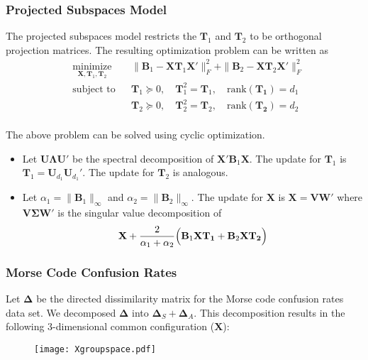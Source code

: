 \documentclass[professionalfonts,hyperref={pdfpagelabels=false,colorlinks=true,linkcolor=cyan}]{beamer}
\begin{document}
\begin{frame}
  \frametitle{Projected Subspaces Model}
  The projected subspaces model restricts the $\mathbf{T}_1$ and
  $\mathbf{T}_2$ to
  be orthogonal projection matrices. The resulting optimization
  problem can be written as
  \begin{equation}
  \label{eq:5}
	\begin{aligned}
	& \underset{\mathbf{X}, \mathbf{T}_1, \mathbf{T}_2}{\text{minimize}}
	& & \| \mathbf{B}_1 - \mathbf{X}
\mathbf{T}_1 \mathbf{X}' \|_F^2 +  \| \mathbf{B}_2 - \mathbf{X}
\mathbf{T}_2 \mathbf{X}' \|_F^2 \\
	& \text{subject to}
	& & \mathbf{T}_1 \succeq 0, \quad \mathbf{T}_1^2 = \mathbf{T}_1,
    \quad \mathrm{rank}(\mathbf{T_1}) = d_1 \\
	& & & \mathbf{T}_2 \succeq 0, \quad \mathbf{T}_2^2 = \mathbf{T}_2,
    \quad \mathrm{rank}(\mathbf{T_2}) = d_2 \\
	\end{aligned}
\end{equation}

The above problem can be solved using cyclic optimization. 
\begin{itemize}
\item Let $\mathbf{U} \bm{\Lambda} \mathbf{U}'$ be the spectral
  decomposition of $\mathbf{X}' \mathbf{B}_1 \mathbf{X}$. The update
  for $\mathbf{T}_1$ is $\mathbf{T}_1 = \mathbf{U}_{d_1}
  \mathbf{U}_{d_1}'$. The update for $\mathbf{T}_2$ is analogous.
\item Let $\alpha_1 = \| \mathbf{B}_1 \|_{\infty}$ and $\alpha_2 = \|
  \mathbf{B}_2 \|_{\infty}$. The update for
  $\mathbf{X}$ is $\mathbf{X} = \mathbf{V} \mathbf{W}'$
  \cite{kiers90:_major} where $\mathbf{V} \bm{\Sigma} \mathbf{W}'$ is
  the singular value decomposition of
  \begin{equation}
    \label{eq:3}
    \mathbf{X} + \frac{2}{\alpha_1 + \alpha_2} \Bigl( 
    \mathbf{B}_1 \mathbf{X} \mathbf{T_1} + \mathbf{B}_2 \mathbf{X}
    \mathbf{T_2} \Bigr)
  \end{equation}
\end{itemize}
\end{frame}

\begin{frame}
  \frametitle{Morse Code Confusion Rates} 
  Let $\bm{\Delta}$ be the directed dissimilarity matrix for the
  Morse code confusion rates data set. We decomposed $\bm{\Delta}$
  into $\bm{\Delta}_S + \bm{\Delta}_A$. This decomposition results in
  the following 3-dimensional common configuration ($\mathbf{X}$): 
  \begin{figure}[hbtp]
    \centering
    \texttt{[image: Xgroupspace.pdf]}
    \label{fig:morsecode3d}
  \end{figure}
\end{frame}
\end{document}
